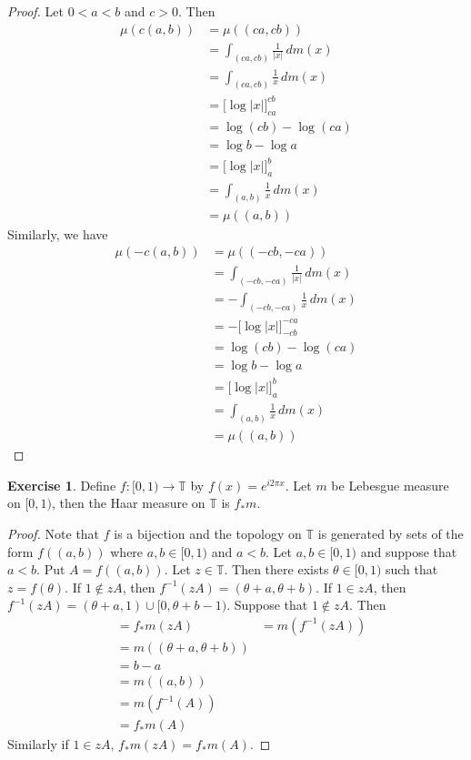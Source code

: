 \documentclass[12pt]{amsart}
\theoremstyle{definition}
\newtheorem{ex}[definition]{Exercise}
\newcommand{\T}{\mathbb{T}}
\newcommand{\dm}{\, d m}
\newcommand{\lex}[1]{\label{ex:#1}}
\begin{document}
	\begin{proof}
		Let $0 < a < b$ and $c >0$. Then
		\begin{align*}
			\mu(c(a, b))
			& = \mu((ca,cb)) \\
			& = \int_{(ca,cb)} \frac{1}{|x|} \dm(x)\\
			& = \int_{(ca,cb)} \frac{1}{x} \dm(x)\\
			& = \bigg[ \log|x| \bigg]_{ca}^{cb} \\
			& = \log(cb) - \log(ca) \\
			& = \log b - \log a \\
			& = \bigg[ \log|x| \bigg]_{a}^{b} \\ 
			& =  \int_{(a,b)} \frac{1}{x} \dm(x)\\
			& = \mu((a,b))
		\end{align*}
	Similarly, we have
	\begin{align*}
		\mu(-c(a, b))
		& = \mu((-cb,-ca)) \\
		& = \int_{(-cb,-ca)} \frac{1}{|x|} \dm(x)\\
		& = - \int_{(-cb,-ca)} \frac{1}{x} \dm(x)\\
		& = - \bigg[ \log|x| \bigg]_{-cb}^{-ca} \\
		& = \log(cb) - \log(ca) \\
		& = \log b - \log a \\
		& = \bigg[ \log|x| \bigg]_{a}^{b} \\ 
		& =  \int_{(a,b)} \frac{1}{x} \dm(x)\\
		& = \mu((a,b))
	\end{align*}
	\end{proof}

	\begin{ex} \lex{00000} 
		Define $f: [ 0,1) \rightarrow \T$ by $f(x) = e^{i2 \pi x}$. Let $m$ be Lebesgue measure on $[0,1)$, then the Haar measure on $\T$ is $f_*m$.
	\end{ex}

	\begin{proof}
		Note that $f$ is a bijection and the topology on $\T$ is generated by sets of the form $f((a, b))$ where $a,b \in [0,1)$ and $a< b$. Let $a,b \in [ 0,1 )$ and suppose that $a<b$. Put $A = f((a, b))$. Let $z \in \T$. Then there exists $\theta \in [0, 1)$ such that $z = f(\theta)$. If $1 \not \in zA$, then $f^{-1}(zA) = (\theta + a, \theta + b)$. If $1 \in zA$, then $f^{-1}(zA) = (\theta + a , 1) \cup [0,  \theta + b - 1)$. Suppose that $1 \not \in zA$. Then
		\begin{align*}
			& = f_*m(zA) 
			& = m(f^{-1}(zA)) \\
			& = m((\theta + a, \theta + b)) \\
			& = b - a \\
			& = m((a,b)) \\
			& = m(f^{-1}(A)) \\
			& = f_*m(A)
		\end{align*}
	Similarly if $1 \in zA$, $f_*m(zA) = f_*m(A)$.
	\end{proof} 
\end{document}

